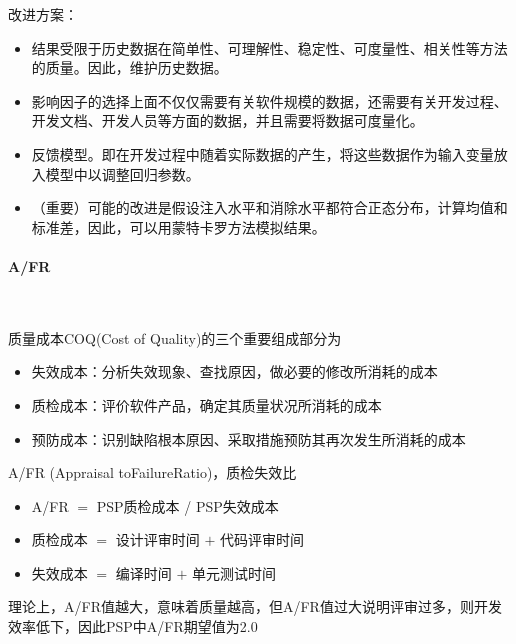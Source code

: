 \begin{problem}
改进方案：
\begin{itemize}
    \item 结果受限于历史数据在简单性、可理解性、稳定性、可度量性、相关性等方法的质量。因此，维护历史数据。
    \item 影响因子的选择上面不仅仅需要有关软件规模的数据，还需要有关开发过程、开发文档、开发人员等方面的数据，并且需要将数据可度量化。
    \item 反馈模型。即在开发过程中随着实际数据的产生，将这些数据作为输入变量放入模型中以调整回归参数。
    \item （重要）可能的改进是假设注入水平和消除水平都符合正态分布，计算均值和标准差，因此，可以用蒙特卡罗方法模拟结果。
\end{itemize}
\end{problem}

\paragraph{A/FR}~{} \par
质量成本COQ(Cost of Quality)的三个重要组成部分为
\begin{itemize}
    \item 失效成本：分析失效现象、查找原因，做必要的修改所消耗的成本
    \item 质检成本：评价软件产品，确定其质量状况所消耗的成本
    \item 预防成本：识别缺陷根本原因、采取措施预防其再次发生所消耗的成本
\end{itemize}

A/FR (Appraisal toFailureRatio)，质检失效比
\vspace{-0.8em}
\begin{multicols}{2}
    \begin{itemize}
        \item A/FR $=$ PSP质检成本 / PSP失效成本
        \item 质检成本 $=$ 设计评审时间 $+$ 代码评审时间
        \item 失效成本 $=$ 编译时间 $+$ 单元测试时间
    \end{itemize}
\end{multicols}
\vspace{-1em}

理论上，A/FR值越大，意味着质量越高，但A/FR值过大说明评审过多，则开发效率低下，因此PSP中A/FR期望值为2.0

